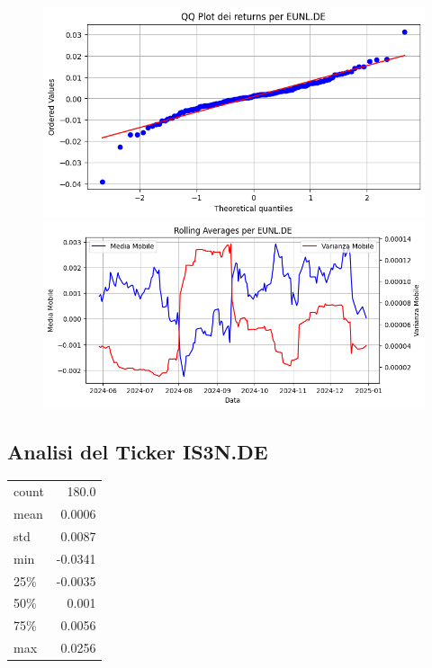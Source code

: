 \documentclass{article}%
\begin{document}
%


\begin{figure}[htbp]%
\begin{minipage}{0.48\textwidth}%
\includegraphics[width=\linewidth]{immagini_tickers/EUNL.DE_qq_plot.png}%
\end{minipage}%
\begin{minipage}{0.48\textwidth}%
\includegraphics[width=\linewidth]{immagini_tickers/EUNL.DE_rolling_averages.png}%
\end{minipage}%
\end{figure}

%
\subsection*{Analisi del Ticker IS3N.DE}%
\label{subsec:AnalisidelTickerIS3N.DE}%
\begin{tabular}{lr}%
count&180.0\\%
mean&0.0006\\%
std&0.0087\\%
min&{-}0.0341\\%
25\%&{-}0.0035\\%
50\%&0.001\\%
75\%&0.0056\\%
max&0.0256\\%
\end{tabular}%
\end{document}
